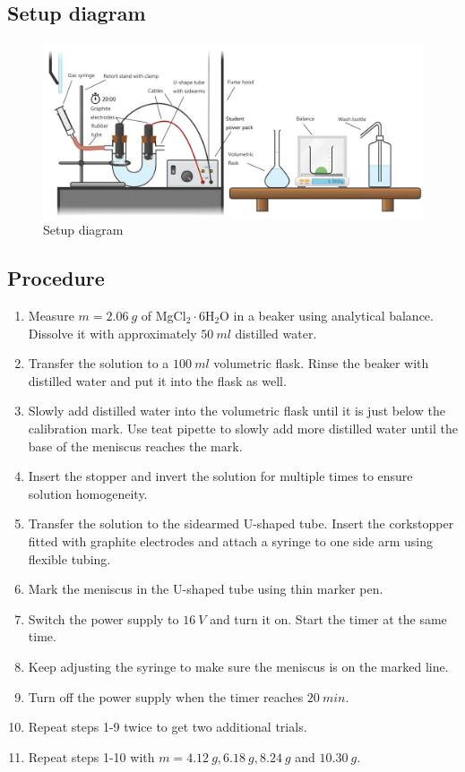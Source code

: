 \documentclass[a4paper]{article}
\begin{document}
\subsection{Setup diagram}

\begin{figure}[ht]
    \centering
    \includegraphics[width=\textwidth]{setup.jpg}
    \caption{Setup diagram\protect\footnotemark[1] \label{this:figure}}
\end{figure}


\subsection{Procedure}

\begin{enumerate}
    \item Measure $m=\SI{2.06}{g}$ of MgCl${}_2\cdot 6$H${}_2$O in a beaker using analytical balance. Dissolve it with approximately $\SI{50}{ml}$ distilled water.
    \item Transfer the solution to a $\SI{100}{ml}$ volumetric flask. Rinse the beaker with distilled water and put it into the flask as well.
    \item Slowly add distilled water into the volumetric flask until it is just below the calibration mark. Use teat pipette to slowly add more distilled water until the base of the meniscus reaches the mark.
    \item Insert the stopper and invert the solution for multiple times to ensure solution homogeneity.
    \item Transfer the solution to the sidearmed U-shaped tube. Insert the corkstopper fitted with graphite electrodes and attach a syringe to one side arm using flexible tubing.
    \item Mark the meniscus in the U-shaped tube using thin marker pen.
    \item Switch the power supply to $\SI{16}{V}$ and turn it on. Start the timer at the same time.
    \item Keep adjusting the syringe to make sure the meniscus is on the marked line.
    \item Turn off the power supply when the timer reaches $\SI{20}{min}$.
    \item Repeat steps 1-9 twice to get two additional trials.
    \item Repeat steps 1-10 with $m=\SI{4.12}{g},\SI{6.18}{g},\SI{8.24}{g}$ and $\SI{10.30}{g}$.
\end{enumerate}
\end{document}
